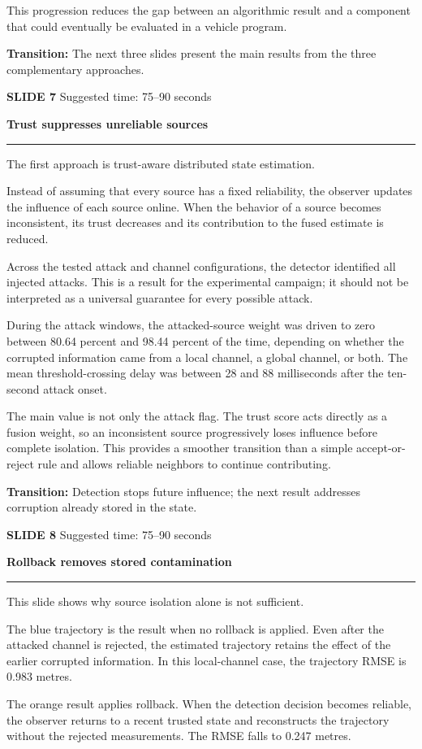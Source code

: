 \documentclass[11pt,a4paper]{article}
\newcommand{\slidetitle}[3]{%
  \clearpage
  {\color{Accent}\large\bfseries SLIDE #1}\hfill
  {\color{Muted}\small Suggested time: #3}\par
  \vspace{0.18cm}
  {\LARGE\bfseries #2}\par
  \vspace{0.20cm}
  {\color{Muted}\rule{\textwidth}{0.5pt}}\par
  \vspace{0.12cm}
}
\newcommand{\transition}[1]{%
  \vfill
  \colorbox{Panel}{%
    \parbox{\dimexpr\textwidth-2\fboxsep\relax}{%
      \raggedright\textbf{Transition:} #1}}
}
\begin{document}
This progression reduces the gap between an algorithmic result and a component that could eventually be evaluated in a vehicle program.

\transition{The next three slides present the main results from the three complementary approaches.}

\slidetitle{7}{Trust suppresses unreliable sources}{75--90 seconds}

The first approach is trust-aware distributed state estimation.

Instead of assuming that every source has a fixed reliability, the observer updates the influence of each source online. When the behavior of a source becomes inconsistent, its trust decreases and its contribution to the fused estimate is reduced.

Across the tested attack and channel configurations, the detector identified all injected attacks. This is a result for the experimental campaign; it should not be interpreted as a universal guarantee for every possible attack.

During the attack windows, the attacked-source weight was driven to zero between 80.64 percent and 98.44 percent of the time, depending on whether the corrupted information came from a local channel, a global channel, or both. The mean threshold-crossing delay was between 28 and 88 milliseconds after the ten-second attack onset.

The main value is not only the attack flag. The trust score acts directly as a fusion weight, so an inconsistent source progressively loses influence before complete isolation. This provides a smoother transition than a simple accept-or-reject rule and allows reliable neighbors to continue contributing.

\transition{Detection stops future influence; the next result addresses corruption already stored in the state.}

\slidetitle{8}{Rollback removes stored contamination}{75--90 seconds}

This slide shows why source isolation alone is not sufficient.

The blue trajectory is the result when no rollback is applied. Even after the attacked channel is rejected, the estimated trajectory retains the effect of the earlier corrupted information. In this local-channel case, the trajectory RMSE is 0.983 metres.

The orange result applies rollback. When the detection decision becomes reliable, the observer returns to a recent trusted state and reconstructs the trajectory without the rejected measurements. The RMSE falls to 0.247 metres.
\end{document}
